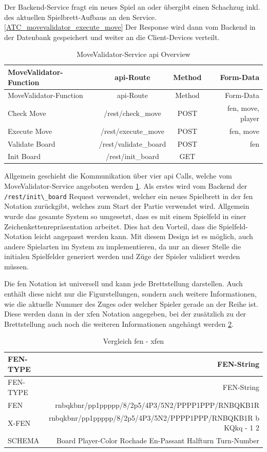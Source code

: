 Der Backend-Service fragt ein neues Spiel an oder übergibt einen
Schachzug inkl. des aktuellen Spielbrett-Aufbaus an den
Service.\ref{ATC_movevalidator_execute_move} Der Response wird dann vom
Backend in der Datenbank gespeichert und weiter an die Client-Devices
verteilt.

\begin{longtable}[]{@{}lccr@{}}
\caption{MoveValidator-Service \gls{api} Overview
\label{finalfeaturesatc}}\tabularnewline
\toprule
MoveValidator-Function & \gls{api}-Route & Method &
Form-Data\tabularnewline
\midrule
\endfirsthead
\toprule
MoveValidator-Function & \gls{api}-Route & Method &
Form-Data\tabularnewline
\midrule
\endhead
Check Move & /rest/check\_move & POST & fen, move, player\tabularnewline
Execute Move & /rest/execute\_move & POST & fen, move\tabularnewline
Validate Board & /rest/validate\_board & POST & fen\tabularnewline
Init Board & /rest/init\_board & GET &\tabularnewline
\bottomrule
\end{longtable}

Allgemein geschieht die Kommunikation über vier \gls{api} Calls, welche
vom MoveValidator-Service angeboten werden \ref{finalfeaturesatc}. Als
erstes wird vom Backend der \passthrough{\lstinline!/rest/init\_board!}
Request verwendet, welcher ein neues Spielbrett in der \gls{fen}
Notation zurückgibt, welches zum Start der Partie verwendet wird.
Allgemein wurde das gesamte System so umgesetzt, dass es mit einem
Spielfeld in einer Zeichenkettenrepräsentation arbeitet. Dies hat den
Vorteil, dass die Spielfeld-Notation leicht angepasst werden kann. Mit
diesem Design ist es möglich, auch andere Spielarten im System zu
implementieren, da nur an dieser Stelle die initialen Spielfelder
generiert werden und Züge der Spieler validiert werden müssen.

Die \gls{fen} Notation ist universell und kann jede Brettstellung
darstellen. Auch enthält diese nicht nur die Figurstellungen, sondern
auch weitere Informationen, wie die aktuelle Nummer des Zuges oder
welcher Spieler gerade an der Reihe ist. Diese werden dann in der
\gls{xfen} Notation angegeben, bei der zusätzlich zu der Brettstellung
auch noch die weiteren Informationen angehängt werden \ref{fenxfen}.

\begin{longtable}[]{@{}lr@{}}
\caption{Vergleich \gls{fen} - \gls{xfen}
\label{fenxfen}}\tabularnewline
\toprule
FEN-TYPE & FEN-String\tabularnewline
\midrule
\endfirsthead
\toprule
FEN-TYPE & FEN-String\tabularnewline
\midrule
\endhead
FEN & rnbqkbnr/pp1ppppp/8/2p5/4P3/5N2/PPPP1PPP/RNBQKB1R\tabularnewline
X-FEN & rnbqkbnr/pp1ppppp/8/2p5/4P3/5N2/PPPP1PPP/RNBQKB1R b KQkq - 1
2\tabularnewline
SCHEMA & Board Player-Color Rochade En-Passant Halfturn
Turn-Number\tabularnewline
\bottomrule
\end{longtable}

